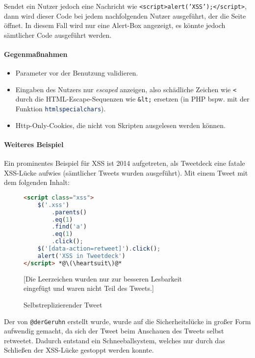 						Sendet ein Nutzer jedoch eine Nachricht wie \texttt{<script>alert('XSS');</script>}, dann wird dieser Code bei jedem nachfolgenden Nutzer ausgeführt, der die Seite öffnet. In diesem Fall wird nur eine Alert-Box angezeigt, es könnte jedoch sämtlicher Code ausgeführt werden.
					
					\paragraph{Gegenmaßnahmen}
						\begin{itemize}
							\item Parameter vor der Benutzung validieren.
							\item Eingaben des Nutzers nur \textit{escaped} anzeigen, also schädliche Zeichen wie \texttt{<} durch die HTML-Escape-Sequenzen wie \texttt{\&lt;} ersetzen (in PHP bspw. mit der Funktion \lstinline[language = PHP]|htmlspecialchars|).
							\item Http-Only-Cookies, die nicht von Skripten ausgelesen werden können.
						\end{itemize}
					
					\paragraph{Weiteres Beispiel}
						Ein prominentes Beispiel für XSS ist 2014 aufgetreten, als Tweetdeck eine fatale XSS-Lücke aufwies (sämtlicher Tweets wurden ausgeführt). Mit einem Tweet mit dem folgenden Inhalt:
						\begin{figure}[H]
							\centering
							\begin{lstlisting}[language = HTML]
<script class="xss">
	$('.xss')
		.parents()
		.eq(1)
		.find('a')
		.eq(1)
		.click();
	$('[data-action=retweet]').click();
	alert('XSS in Tweetdeck')
</script> *@\(\heartsuit\)@*
\end{lstlisting}
							[Die Leerzeichen wurden nur zur besseren Lesbarkeit \\ eingefügt und waren nicht Teil des Tweets.]
							\caption{Selbstreplizierender Tweet}
						\end{figure}
						Der von \texttt{@derGeruhn} erstellt wurde, wurde auf die Sicherheitslücke in großer Form aufwendig gemacht, da sich der Tweet beim Anschauen des Tweets selbst retweetet. Dadurch entstand ein Schneeballsystem, welches nur durch das Schließen der XSS-Lücke gestoppt werden konnte.
	
